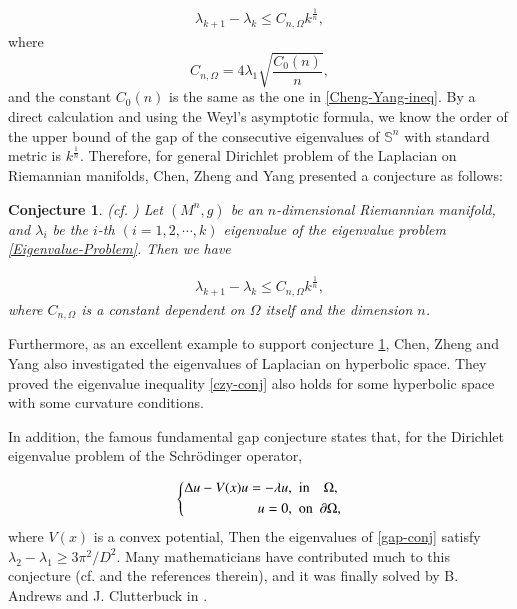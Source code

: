 \documentclass[12pt]{article}
\newtheorem{con}[thm]{Conjecture}
\numberwithin{equation}{section}
\begin{document}
\begin{equation}\label{czy-1}\begin{aligned}\lambda_{k+1}-\lambda_{k}\leq
C_{n,\Omega}k^{\frac{1}{n}},\end{aligned}
\end{equation}
where $$C_{n,\Omega}=4\lambda_{1}\sqrt{\frac{C_{0}(n)}{n}},$$ and the constant $C_{0}(n)$ is the same as the one in \eqref{Cheng-Yang-ineq}. By a direct calculation and using the Weyl's asymptotic formula, we know the order of the upper
bound of the gap of the consecutive eigenvalues of $\mathbb{S}^{n}$ with
standard metric is $k^{\frac{1}{n}}$. Therefore, for general Dirichlet
problem of the Laplacian on Riemannian manifolds, Chen, Zheng and Yang presented a conjecture as follows:

\begin{con}\label{con1}(cf. {\rm \cite{CZY}})
Let $(M^{n},g)$ be an $n$-dimensional Riemannian manifold, and $\lambda_{i}$ be the $i$-th $(i=1,2,\cdots,k)$
eigenvalue of the eigenvalue problem \eqref{Eigenvalue-Problem}. Then we have


\begin{equation}\label{czy-conj}\begin{aligned}\lambda_{k+1}-\lambda_{k}\leq
C_{n,\Omega}k^{\frac{1}{n}},\end{aligned}
\end{equation}
where $C_{n,\Omega}$ is a constant dependent on $\Omega$ itself and the dimension $n$.
\end{con}
Furthermore, as an excellent example to support conjecture \ref{con1}, Chen, Zheng and Yang also investigated the eigenvalues of Laplacian on hyperbolic space.
They proved the eigenvalue inequality \eqref{czy-conj} also holds for some  hyperbolic space with some curvature conditions.

In addition, the famous fundamental gap conjecture states that, for the Dirichlet eigenvalue
problem of the Schr\"{o}dinger operator,

\begin{equation}
\left\{ \begin{aligned}\label{gap-conj}\Delta u-V(x) u=-\lambda u,\ \ &{\rm
in}\ \ \ \ \Omega,
         \\
u=0,\ \ &{\rm on}\ \ \partial\Omega,
                          \end{aligned} \right.
                          \end{equation}where $V(x)$ is a convex potential, Then the eigenvalues of \eqref{gap-conj} satisfy $\lambda_{2}-\lambda_{1}\geq3\pi^{2}/D^{2}.$
Many mathematicians have contributed much to this conjecture  (cf. {\rm \cite{AC,B,SWYY,YY,YZ}} and the references therein), and it was finally solved by B. Andrews and J. Clutterbuck in {\rm  \cite{AC}}.
\end{document}
